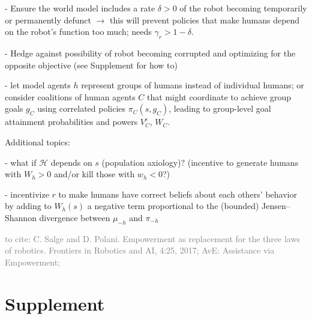 \documentclass[letterpaper]{article} %
\def\H{\mathcal{H}}
\def\gray#1{\textcolor{gray}{#1}}
\begin{document}
- Ensure the world model includes a rate $\delta>0$ of the robot becoming temporarily or permanently defunct $\to$ this will prevent policies that make humans depend on the robot's function too much; needs $\gamma_r>1-\delta$.

- Hedge against possibility of robot becoming corrupted and optimizing for the opposite objective (see Supplement for how to)

- let model agents $h$ represent groups of humans instead of individual humans; or consider coalitions of human agents $C$ that might coordinate to achieve group goals $g_C$ using correlated policies $\pi_C(s,g_C)$, leading to group-level goal attainment probabilities and powers $V^e_C$, $W_C$.

Additional topics:

- what if $\H$ depends on $s$ (population axiology)? (incentive to generate humans with $W_h>0$ and/or kill those with $w_h<0$?)

- incentivize $r$ to make humans have correct beliefs about each others' behavior by adding to $W_h(s)$ a negative term proportional to the (bounded) Jensen--Shannon divergence between $\mu_{-h}$ and $\pi_{-h}$ 



\gray{
to cite: 
C. Salge and D. Polani. Empowerment as replacement for the three laws of robotics. Frontiers in Robotics and AI, 4:25, 2017;
AvE: Assistance via Empowerment;
}

\clearpage
\section*{Supplement}
\end{document}
